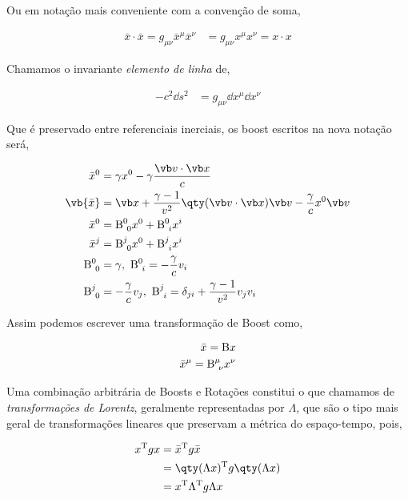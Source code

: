 \documentclass[twoside]{amsart}
\numberwithin{equation}{section}
\begin{document}
\begin{refsection}
Ou em notação mais conveniente com a convenção de soma,

\begin{align}
    \bar x\cdot \bar x=g_{\mu\nu}{\bar x}^\mu {\bar x}^\nu&=g_{\mu\nu}x^\mu x^\nu=x\cdot x
\end{align}

Chamamos o invariante \emph{elemento de linha} de,

\begin{align}
    -c^2\dd{s}^2&=g_{\mu\nu}\dd{x^\mu}\dd{x^\nu}
\end{align}

Que é preservado entre referenciais inerciais, os boost escritos na nova notação será,

\begin{align}
    {\bar x}^0&=\gamma x^0-\gamma\frac{\vb v\cdot\vb x}{c}\\
    \vb {\bar x}&=\vb x+\frac{\gamma-1}{v^2}\qty(\vb v \cdot \vb x)\vb v-\frac{\gamma}{c} x^0\vb v\\
    {\bar x}^0&={\textup B}^0_{\ 0}x^0+{\textup B}^0_{\ i}x^i\\
    {\bar x}^j&={\textup B}^j_{\ 0}x^0+{\textup B}^j_{\ i}x^i\\
    {\textup B}^0_{\ 0}&=\gamma,\ {\textup B}^0_{\ i}=-\frac{\gamma}{c}v_i\\
    {\textup B}^j_{\ 0}&=-\frac{\gamma}{c}v_j,\ {\textup B}^j_{\ i}=\delta_{ji}+\frac{\gamma-1}{v^2}v_jv_i
\end{align}

Assim podemos escrever uma transformação de Boost como,

\begin{align}
    \bar x={\textup B} x\\
    {\bar x}^\mu={\textup B}^\mu_{\ \nu}x^\nu
\end{align}

Uma combinação arbitrária de Boosts e Rotações constitui o que chamamos de \emph{transformações de Lorentz}, geralmente representadas por $\Lambda$, que são o tipo mais geral de transformações lineares que preservam a métrica do espaço-tempo, pois,

\begin{align}
    x^{\textup T}g x&={\bar x}^{\textup T}g{\bar x}\\
    &=\qty(\Lambda x)^{\textup T}g\qty(\Lambda x)\\
    &=x^{\textup T}\Lambda^{\textup T}g\Lambda x
\end{align}


\end{refsection}
\end{document}
